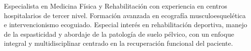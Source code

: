

\begin{cvparagraph}

Especialista en Medicina Física y Rehabilitación con experiencia en centros hospitalarios de tercer nivel. Formación avanzada en ecografía musculoesquelética e intervencionismo ecoguiado. Especial interés en rehabilitación deportiva, manejo de la espasticidad y abordaje de la patología de suelo pélvico, con un enfoque integral y multidisciplinar centrado en la recuperación funcional del paciente.
\end{cvparagraph}

